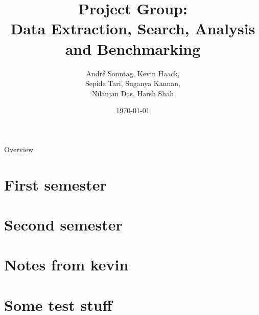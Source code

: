 \documentclass{beamer}
\title{Project Group:\\Data Extraction, Search, Analysis and Benchmarking}
\author{André Sonntag, Kevin Haack,\\Sepide Tari, Suganya Kannan,\\Nilanjan Das, Harsh Shah}
\institute{Paderborn University}
\date{\today}
\begin{document}
\begin{frame}
  \titlepage
\end{frame}

\begin{frame}{Overview}
\tableofcontents
\end{frame}



\section{First semester}







\section{Second semester}





\section{Notes from kevin}





\section{Some test stuff}


\end{document}
